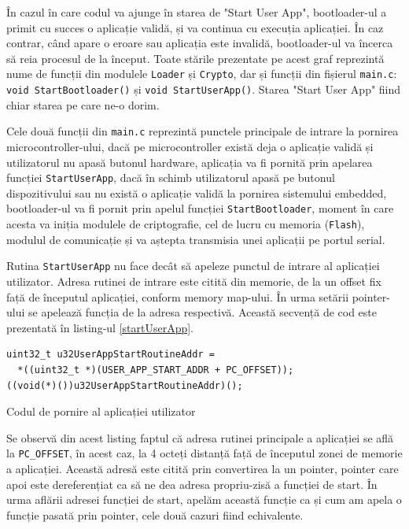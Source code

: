 \documentclass[12pt,a4paper,titlepage]{report}
\begin{document}
În cazul în care codul va ajunge în starea de "Start User App", bootloader-ul a primit cu succes o aplicație validă, și va continua cu execuția aplicației.
În caz contrar, când apare o eroare sau aplicația este invalidă, bootloader-ul va încerca să reia procesul de la început.
Toate stările prezentate pe acest graf reprezintă nume de funcții din modulele \texttt{Loader} și \texttt{Crypto}, dar și funcții din fișierul \texttt{main.c}: \texttt{void StartBootloader()} și \texttt{void StartUserApp()}.
Starea "Start User App" fiind chiar starea pe care ne-o dorim.

Cele două funcții din \texttt{main.c} reprezintă punctele principale de intrare la pornirea microcontroller-ului, dacă pe microcontroller există deja o aplicație validă și utilizatorul nu apasă butonul hardware, aplicația va fi pornită prin apelarea funcției \texttt{StartUserApp}, dacă în schimb utilizatorul apasă pe butonul dispozitivului sau nu există o aplicație validă la pornirea sistemului embedded, bootloader-ul va fi pornit prin apelul funcției \texttt{StartBootloader}, moment în care acesta va iniția modulele de criptografie, cel de lucru cu memoria (\texttt{Flash}), modulul de comunicație și va aștepta transmisia unei aplicații pe portul serial.

Rutina \texttt{StartUserApp} nu face decât să apeleze punctul de intrare al aplicației utilizator. Adresa rutinei de intrare este citită din memorie, de la un offset fix față de începutul aplicației, conform memory map-ului. În urma setării pointer-ului se apelează funcția de la adresa respectivă. Această secvență de cod este prezentată în listing-ul \ref{startUserApp}.

\begin{listing}[h]
\begin{verbatim}
uint32_t u32UserAppStartRoutineAddr = 
  *((uint32_t *)(USER_APP_START_ADDR + PC_OFFSET));
((void(*)())u32UserAppStartRoutineAddr)();
\end{verbatim}

\caption{Codul de pornire al aplicației utilizator}
\label{startUserApp}
\end{listing}

Se observă din acest listing faptul că adresa rutinei principale a aplicației se află la \texttt{PC\_OFFSET}, în acest caz, la 4 octeți distanță față de începutul zonei de memorie a aplicației. Această adresă este citită prin convertirea la un pointer, pointer care apoi este dereferențiat ca să ne dea adresa propriu-zisă a funcției de start. În urma aflării adresei funcției de start, apelăm această funcție ca și cum am apela o funcție pasată prin pointer, cele două cazuri fiind echivalente.
\end{document}
